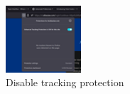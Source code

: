 \begin{figure}[h]
    \centering
    \includegraphics[width=0.25\textwidth]{./chapters/1_loading/images/remove_enhanced_tracking_protection.png}
    \caption{Disable tracking protection}
    \label{fig:remove_enhanced_tracking_protection}
\end{figure}
